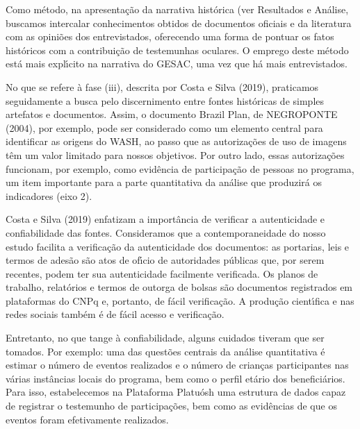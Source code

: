 \documentclass[
12pt,		%
openright,	%
twoside,  %
a4paper,			%
chapter=TITLE,		%
english,			%
french,				%
spanish,			%
brazil				%
]{USPSC-classe/USPSC}
\begin{document}
Como m\'etodo, na apresenta\c{c}\~ao da narrativa hist\'orica (ver Resultados e An\'alise, buscamos intercalar conhecimentos obtidos de documentos oficiais e da literatura com as opini\~oes dos entrevistados, oferecendo uma forma de pontuar os fatos hist\'oricos com a contribui\c{c}\~ao de testemunhas oculares. O emprego deste m\'etodo est\'a mais expl\'{\i}cito na narrativa do GESAC, uma vez que h\'a mais entrevistados.








No que se refere \`a fase (iii), descrita por  Costa e Silva (2019), praticamos seguidamente a busca pelo discernimento entre fontes hist\'oricas de simples artefatos e documentos. Assim, o documento \textquotedbl Brazil Plan\textquotedbl , de  NEGROPONTE (2004), por exemplo, pode ser considerado como um elemento central para identificar as origens do WASH, ao passo que as autoriza\c{c}\~oes de uso de imagens t\^em um valor limitado para nossos objetivos.  Por outro lado, essas autoriza\c{c}\~oes funcionam, por exemplo, como evid\^encia de participa\c{c}\~ao de pessoas no programa, um item importante para a parte quantitativa da an\'alise que produzir\'a os indicadores (eixo 2).








Costa e Silva (2019) enfatizam a import\^ancia de verificar a autenticidade e confiabilidade das fontes. Consideramos que a contemporaneidade do nosso estudo facilita a verifica\c{c}\~ao da autenticidade dos documentos: as portarias, leis e termos de ades\~ao s\~ao atos de of\'{\i}cio de autoridades p\'ublicas que, por serem recentes, podem ter sua autenticidade facilmente verificada. Os planos de trabalho, relat\'orios e termos de outorga de bolsas s\~ao documentos registrados em plataformas do CNPq e, portanto, de f\'acil verifica\c{c}\~ao. A produ\c{c}\~ao cient\'{\i}fica e nas redes sociais tamb\'em \'e de f\'acil acesso e verifica\c{c}\~ao.








Entretanto, no que tange \`a confiabilidade, alguns cuidados tiveram que ser tomados. Por exemplo: uma das quest\~oes centrais da an\'alise quantitativa \'e estimar o n\'umero de eventos realizados e o n\'umero de crian\c{c}as participantes nas v\'arias inst\^ancias locais do programa, bem como o perfil et\'ario dos benefici\'arios. Para isso, estabelecemos na Plataforma Platu\'osh uma estrutura de dados capaz de registrar o testemunho de participa\c{c}\~oes, bem como as evid\^encias de que os eventos foram efetivamente realizados.
\end{document}
